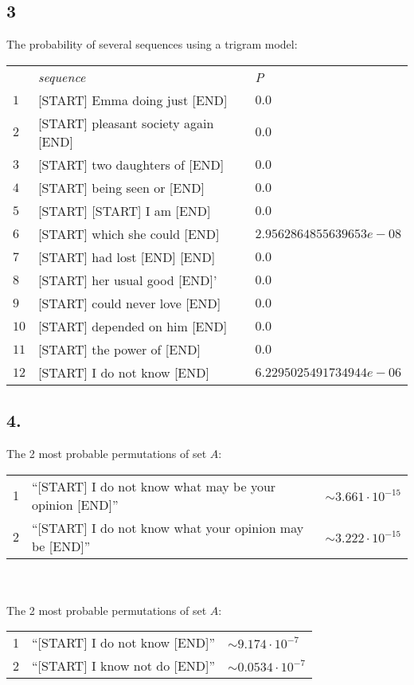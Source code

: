 \documentclass[a4paper, 10pt]{article}
\begin{document}
\subsection*{3}
The probability of several sequences using a trigram model:

\begin{tabular}{l l l}
 & \textit{sequence}	& \textit{P} \\
$1$ & [START] Emma doing just [END] & $0.0$ \\
$2$ & [START] pleasant society again [END] & $0.0$ \\
$3$ & [START] two daughters of [END] & $0.0$ \\
$4$ & [START] being seen or [END] & $0.0$ \\
$5$ & [START] [START] I am [END] & $0.0$ \\
$6$ & [START] which she could [END] & $2.9562864855639653e-08$ \\
$7$ & [START] had lost [END] [END] & $0.0$ \\
$8$ & [START] her usual good [END]' & $0.0$ \\
$9$ & [START] could never love [END] & $0.0$ \\
$10$ & [START] depended on him [END] & $0.0$ \\
$11$ & [START] the power of  [END] & $0.0$ \\
$12$ & [START] I do not know [END] & $6.2295025491734944e-06$ 
\end{tabular}

\subsection*{4.}
The 2 most probable permutations of set $A$:\\
\begin{tabular}{l l l}
1	&	``[START] I do not know what may be your opinion [END]'' & $\sim 3.661 \cdot 10^{-15}$\\
2	&	``[START] I do not know what your opinion may be [END]'' & $\sim 3.222 \cdot 10^{-15}$\\
\end{tabular}\\
\\
The 2 most probable permutations of set $A$:\\
\begin{tabular}{l l l}
1	& ``[START] I do not know [END]''	& $\sim 9.174 \cdot 10^{-7}$ \\
2	& ``[START] I know not do [END]''	& $\sim 0.0534 \cdot 10^{-7}$\\
\end{tabular}
\end{document}
